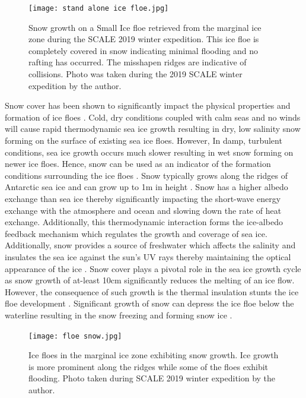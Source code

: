 \begin{figure}[H]
    \centering
    \texttt{[image: stand alone ice floe.jpg]}
    \caption{ Snow growth on a Small Ice floe retrieved from the marginal ice zone during the SCALE 2019 winter expedition. This ice floe is completely covered in snow indicating minimal flooding and no rafting has occurred. The misshapen ridges are indicative of collisions. Photo was taken during the 2019 SCALE winter expedition by the author.}
    \label{fig:lonefloe}
\end{figure}
Snow cover has been shown to significantly impact the physical properties and formation of ice floes \cite{sturm2009snow}. Cold, dry conditions coupled with calm seas and no winds will cause rapid thermodynamic sea ice growth \cite{sturm2009snow} resulting in dry, low salinity snow forming on the surface of existing sea ice floes. However, In damp, turbulent conditions, sea ice growth occurs much slower \cite{sturm2009snow} resulting in wet snow forming on newer ice floes. Hence, snow can be used as an indicator of the formation conditions surrounding the ice floes \cite{sturm2009snow}. Snow typically grows along the ridges of Antarctic sea ice  \cite{massom2001snow} and can grow up to 1m in height \cite{barber2005microwave}. Snow has a higher albedo exchange than sea ice thereby significantly impacting the short-wave energy exchange with the atmosphere and ocean \cite{massom2001snow} and slowing down the rate of heat exchange. Additionally, this thermodynamic interaction forms the ice-albedo feedback mechanism \cite{MASSOM2010149} which regulates the growth and coverage of sea ice. Additionally, snow provides a source of freshwater which affects the salinity and insulates the sea ice against the sun's UV rays thereby maintaining the optical appearance of the ice \cite{MASSOM2010149}. Snow cover plays a pivotal role in the sea ice growth cycle as snow growth of at-least 10cm \cite{galin2012measuring} significantly reduces the melting of an ice flow. However, the consequence of such growth is the thermal insulation stunts the ice floe development \cite{galin2012measuring}. Significant growth of snow can depress the ice floe below the waterline resulting in the snow freezing and forming snow ice \cite{icedefinition1992} \cite{galin2012measuring}.

\begin{figure}[H]
    \centering
    \texttt{[image: floe snow.jpg]}
    \caption{Ice floes in the marginal ice zone exhibiting snow growth. Ice growth is more prominent along the ridges while some of the floes exhibit flooding. Photo taken during SCALE 2019 winter expedition by the author.}
    \label{fig:ridging}
\end{figure}

